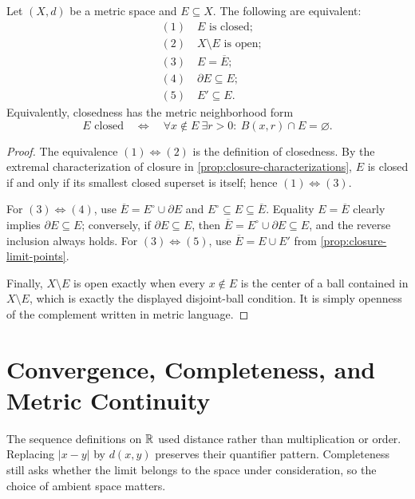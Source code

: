 \begin{theorem}
\label{thm:closed-set-characterizations}
Let $(X,d)$ be a metric space and $E\subseteq X$. The following are
equivalent:
\[
\begin{aligned}
&(1)\quad E\text{ is closed};\\
&(2)\quad X\setminus E\text{ is open};\\
&(3)\quad E=\overline E;\\
&(4)\quad \partial E\subseteq E;\\
&(5)\quad E'\subseteq E.
\end{aligned}
\]
Equivalently, closedness has the metric neighborhood form
\[
E\text{ closed}
\quad\Longleftrightarrow\quad
\forall x\notin E\ \exists r>0:\ B(x,r)\cap E=\varnothing.
\]
\end{theorem}
\begin{proof}
The equivalence $(1)\Longleftrightarrow(2)$ is the definition of
closedness. By the extremal characterization of closure in
\cref{prop:closure-characterizations}, $E$ is closed if and only if its
smallest closed superset is itself; hence $(1)\Longleftrightarrow(3)$.

For $(3)\Longleftrightarrow(4)$, use
$\overline E=E^\circ\cup\partial E$ and
$E^\circ\subseteq E\subseteq\overline E$. Equality
$E=\overline E$ clearly implies $\partial E\subseteq E$; conversely,
if $\partial E\subseteq E$, then
$\overline E=E^\circ\cup\partial E\subseteq E$, and the reverse
inclusion always holds. For $(3)\Longleftrightarrow(5)$, use
$\overline E=E\cup E'$ from \cref{prop:closure-limit-points}.

Finally, $X\setminus E$ is open exactly when every $x\notin E$ is the
center of a ball contained in $X\setminus E$, which is exactly the
displayed disjoint-ball condition. It is simply openness of the complement
written in metric language.
\end{proof}

\section{Convergence, Completeness, and Metric Continuity}

The sequence definitions on $\mathbb{R}$ used distance rather than multiplication
or order. Replacing $|x-y|$ by $d(x,y)$ preserves their quantifier pattern.
Completeness still asks whether the limit belongs to the space under
consideration, so the choice of ambient space matters.

